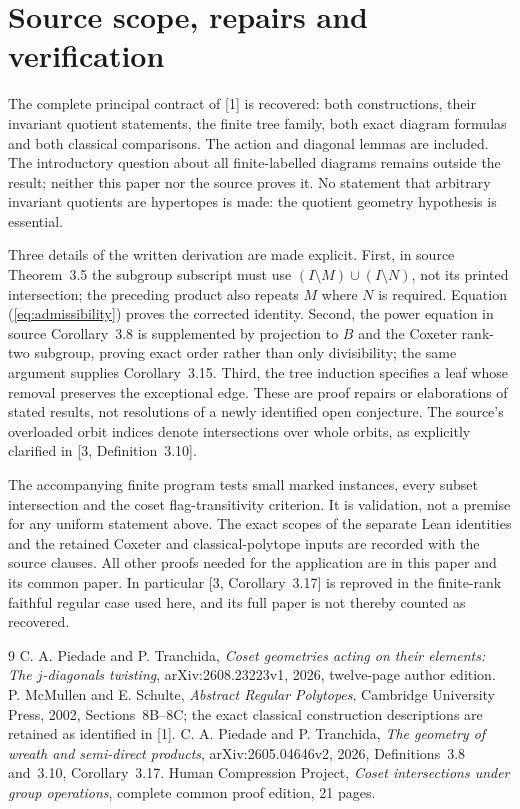 \section{Source scope, repairs and verification}
The complete principal contract of [1] is recovered: both constructions, their invariant quotient statements, the finite tree family, both exact diagram formulas and both classical comparisons. The action and diagonal lemmas are included. The introductory question about all finite-labelled diagrams remains outside the result; neither this paper nor the source proves it. No statement that arbitrary invariant quotients are hypertopes is made: the quotient geometry hypothesis is essential.

Three details of the written derivation are made explicit. First, in source Theorem~3.5 the subgroup subscript must use $(I\setminus M)\cup(I\setminus N)$, not its printed intersection; the preceding product also repeats $M$ where $N$ is required. Equation (\ref{eq:admissibility}) proves the corrected identity. Second, the power equation in source Corollary~3.8 is supplemented by projection to $B$ and the Coxeter rank-two subgroup, proving exact order rather than only divisibility; the same argument supplies Corollary~3.15. Third, the tree induction specifies a leaf whose removal preserves the exceptional edge. These are proof repairs or elaborations of stated results, not resolutions of a newly identified open conjecture. The source's overloaded orbit indices denote intersections over whole orbits, as explicitly clarified in [3, Definition~3.10].

The accompanying finite program tests small marked instances, every subset intersection and the coset flag-transitivity criterion. It is validation, not a premise for any uniform statement above. The exact scopes of the separate Lean identities and the retained Coxeter and classical-polytope inputs are recorded with the source clauses. All other proofs needed for the application are in this paper and its common paper. In particular [3, Corollary~3.17] is reproved in the finite-rank faithful regular case used here, and its full paper is not thereby counted as recovered.
\begin{thebibliography}{9}
 C. A. Piedade and P. Tranchida, \emph{Coset geometries acting on their elements: The $j$-diagonals twisting}, arXiv:2608.23223v1, 2026, twelve-page author edition.
 P. McMullen and E. Schulte, \emph{Abstract Regular Polytopes}, Cambridge University Press, 2002, Sections~8B--8C; the exact classical construction descriptions are retained as identified in [1].
 C. A. Piedade and P. Tranchida, \emph{The geometry of wreath and semi-direct products}, arXiv:2605.04646v2, 2026, Definitions~3.8 and~3.10, Corollary~3.17.
 Human Compression Project, \emph{Coset intersections under group operations}, complete common proof edition, 21 pages.
\end{thebibliography}

